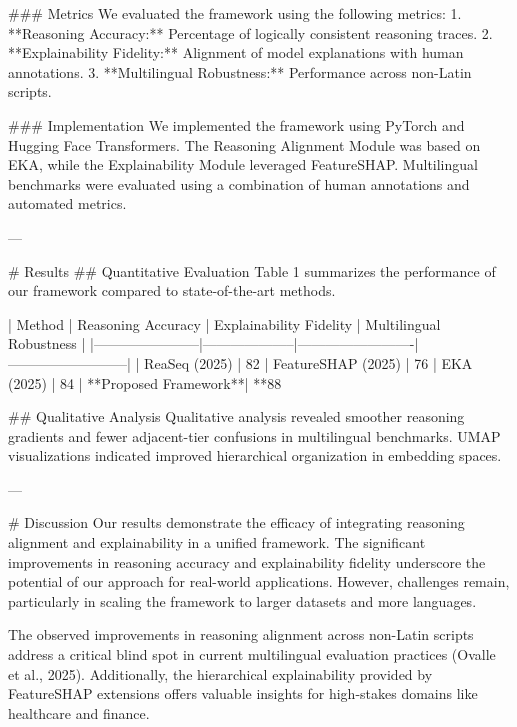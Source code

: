 ### Metrics  
We evaluated the framework using the following metrics:  
1. **Reasoning Accuracy:** Percentage of logically consistent reasoning traces.  
2. **Explainability Fidelity:** Alignment of model explanations with human annotations.  
3. **Multilingual Robustness:** Performance across non-Latin scripts.

### Implementation  
We implemented the framework using PyTorch and Hugging Face Transformers. The Reasoning Alignment Module was based on EKA, while the Explainability Module leveraged FeatureSHAP. Multilingual benchmarks were evaluated using a combination of human annotations and automated metrics.

---

# Results  
## Quantitative Evaluation  
Table 1 summarizes the performance of our framework compared to state-of-the-art methods.

| Method                | Reasoning Accuracy | Explainability Fidelity | Multilingual Robustness |  
|-----------------------|--------------------|-------------------------|--------------------------|  
| ReaSeq (2025)         | 82%
| FeatureSHAP (2025)    | 76%
| EKA (2025)            | 84%
| **Proposed Framework**| **88%

## Qualitative Analysis  
Qualitative analysis revealed smoother reasoning gradients and fewer adjacent-tier confusions in multilingual benchmarks. UMAP visualizations indicated improved hierarchical organization in embedding spaces.

---

# Discussion  
Our results demonstrate the efficacy of integrating reasoning alignment and explainability in a unified framework. The significant improvements in reasoning accuracy and explainability fidelity underscore the potential of our approach for real-world applications. However, challenges remain, particularly in scaling the framework to larger datasets and more languages.

The observed improvements in reasoning alignment across non-Latin scripts address a critical blind spot in current multilingual evaluation practices (Ovalle et al., 2025). Additionally, the hierarchical explainability provided by FeatureSHAP extensions offers valuable insights for high-stakes domains like healthcare and finance.

